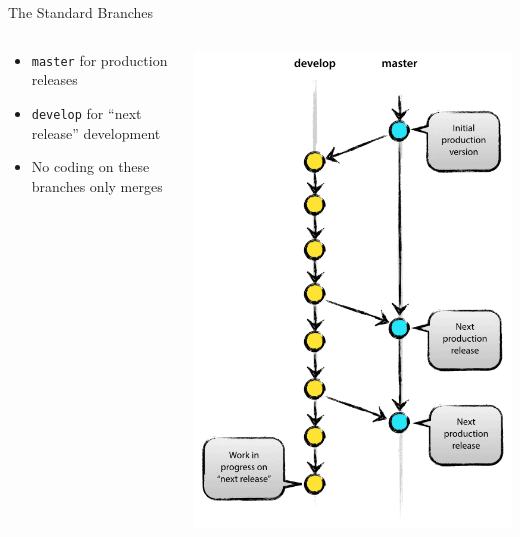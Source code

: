\documentclass[
14pt,
aspectratio=169,
usenames,
dvipsnames,
x11names]{beamer}
\begin{document}
\begin{frame}{The Standard Branches}
  \begin{columns}
    \begin{column}{.65\linewidth}
      \minipage[c][0.5\textheight][s]{\columnwidth}
      \begin{itemize} \setlength{\itemsep}{\fill}
      \item \alert{\texttt{master}} for production releases
      \item \alert{\texttt{develop}} for ``next release'' development
      \item \alert{No coding} on these branches \alert{only merges}
      \end{itemize}
      \endminipage
    \end{column}
    \begin{column}{.35\linewidth}
      \centering
      \includegraphics[width=.9\textwidth]{main-branches}
    \end{column}
  \end{columns}
\end{frame}
\end{document}
